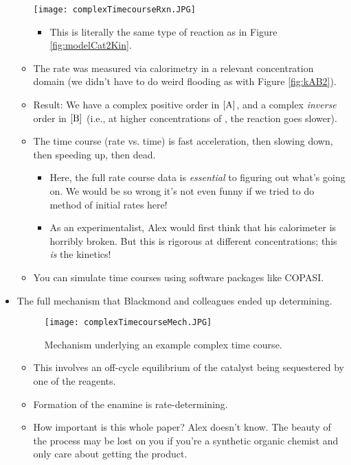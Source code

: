 \documentclass[../notes.tex]{subfiles}
\begin{document}
\begin{itemize}
\begin{itemize}
        \begin{center}
            \texttt{[image: complexTimecourseRxn.JPG]}
        \end{center}
        \begin{itemize}
            \item This is literally the same type of reaction as in Figure \ref{fig:modelCat2Kin}.
        \end{itemize}
        \item The rate was measured via calorimetry in a relevant concentration domain (we didn't have to do weird flooding as with Figure \ref{fig:kAB2}).
        \item Result: We have a complex positive order in $\cnc{A}$, and a complex \emph{inverse} order in $\cnc{B}$ (i.e., at higher concentrations of , the reaction goes slower).
        \item The time course (rate vs. time) is fast acceleration, then slowing down, then speeding up, then dead.
        \begin{itemize}
            \item Here, the full rate course data is \emph{essential} to figuring out what's going on. We would be so wrong it's not even funny if we tried to do method of initial rates here!
            \item As an experimentalist, Alex would first think that his calorimeter is horribly broken. But this is rigorous at different concentrations; this \emph{is} the kinetics!
        \end{itemize}
        \item You can simulate time courses using software packages like COPASI.
    \end{itemize}
    \item The full mechanism that Blackmond and colleagues ended up determining.
    \begin{figure}[H]
        \centering
        \texttt{[image: complexTimecourseMech.JPG]}
        \caption{Mechanism underlying an example complex time course.}
        \label{fig:complexTimecourseMech}
    \end{figure}
    \begin{itemize}
        \item This involves an off-cycle equilibrium of the catalyst being sequestered by one of the reagents.
        \item Formation of the enamine is rate-determining.
        \item How important is this whole paper? Alex doesn't know. The beauty of the process may be lost on you if you're a synthetic organic chemist and only care about getting the product.

\end{itemize}
\end{itemize}
\end{document}
